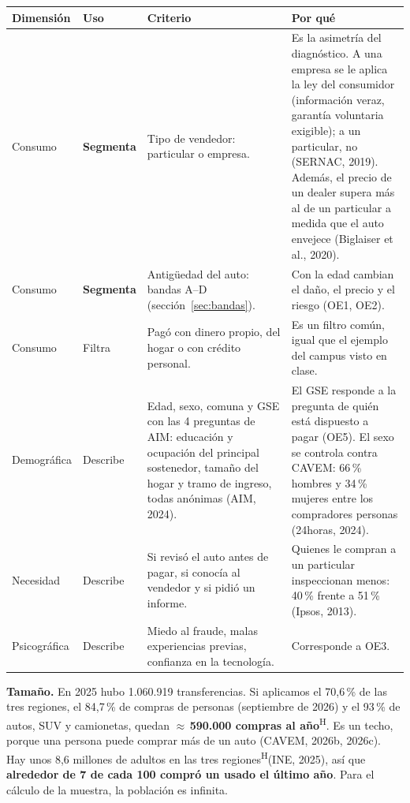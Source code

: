 \documentclass[11pt,a4paper]{article}
\newcommand{\hyp}{\textsuperscript{\textsf{\scriptsize H}}}
\begin{document}
\begin{center}\small
\begin{tabularx}{\textwidth}{@{}p{2.3cm}p{1.6cm}LL@{}}
\toprule
\textbf{Dimensión} & \textbf{Uso} & \textbf{Criterio} & \textbf{Por qué}\\
\midrule
Consumo & \textbf{Segmenta} & Tipo de vendedor: particular o empresa. & Es la asimetría del diagnóstico. A una empresa se le aplica la ley del consumidor (información veraz, garantía voluntaria exigible); a un particular, no (SERNAC, 2019). Además, el precio de un dealer supera más al de un particular a medida que el auto envejece (Biglaiser et al., 2020). \\
Consumo & \textbf{Segmenta} & Antigüedad del auto: bandas A–D (sección~\ref{sec:bandas}). & Con la edad cambian el daño, el precio y el riesgo (OE1, OE2). \\
Consumo & Filtra & Pagó con dinero propio, del hogar o con crédito personal. & Es un filtro común, igual que el ejemplo del campus visto en clase. \\
Demográfica & Describe & Edad, sexo, comuna y GSE con las 4 preguntas de AIM: educación y ocupación del principal sostenedor, tamaño del hogar y tramo de ingreso, todas anónimas (AIM, 2024). & El GSE responde a la pregunta de quién está dispuesto a pagar (OE5). El sexo se controla contra CAVEM: 66\,\% hombres y 34\,\% mujeres entre los compradores personas (24horas, 2024). \\
Necesidad & Describe & Si revisó el auto antes de pagar, si conocía al vendedor y si pidió un informe. & Quienes le compran a un particular inspeccionan menos: 40\,\% frente a 51\,\% (Ipsos, 2013). \\
Psicográfica & Describe & Miedo al fraude, malas experiencias previas, confianza en la tecnología. & Corresponde a OE3. \\
\bottomrule
\end{tabularx}
\end{center}

\textbf{Tamaño.} En 2025 hubo 1.060.919 transferencias. Si aplicamos el 70,6\,\% de las tres regiones, el 84,7\,\% de compras de personas (septiembre de 2026) y el 93\,\% de autos, SUV y camionetas, quedan $\approx$\,\textbf{590.000 compras al año}\hyp. Es un techo, porque una persona puede comprar más de un auto (CAVEM, 2026b, 2026c). Hay unos 8,6 millones de adultos en las tres regiones\hyp (INE, 2025), así que \textbf{alrededor de 7 de cada 100 compró un usado el último año}. Para el cálculo de la muestra, la población es infinita.
\end{document}
